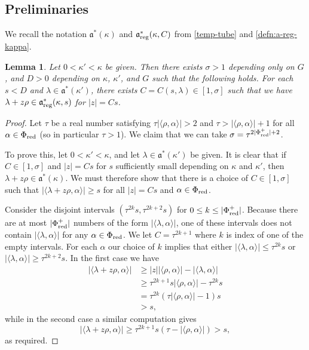 \documentclass[12pt]{amsart}
\newtheorem{lemma}[theorem]{Lemma}
\theoremstyle{remark}
\begin{document}
\subsection{Preliminaries}
\label{sec:sph-fn-prelim}

We recall the notation $\mathfrak{a}^* (\kappa)$ and $\mathfrak{a}_{\rm reg}^* (\kappa,C)$ from \eqref{temp-tube} and \eqref{defn:a-reg-kappa}.

\begin{lemma}
\label{lemma:diskchoice}
    Let $0 < \kappa' < \kappa$ be given. Then there exists $\sigma > 1$ depending only on $G$, and $D > 0$ depending on $\kappa$, $\kappa'$, and $G$ such that the following holds. For each $s < D$ and $\lambda \in \mathfrak{a}^*(\kappa')$, there exists $C = C(s,\lambda) \in [1, \sigma]$ such that we have $\lambda + z \rho \in \mathfrak{a}^*_{\textnormal{reg}}(\kappa, s)$ for $|z| = C s$.  
\end{lemma}
\begin{proof}
    Let $\tau$ be a real number satisfying $\tau | \langle \rho, \alpha \rangle | > 2$ and $\tau > |\langle \rho, \alpha \rangle| + 1$ for all $\alpha \in \Phi_{\textnormal{red}}$ (so in particular $\tau > 1$). We claim that we can take $\sigma = \tau^{2|\Phi_{\textnormal{red}}^+| + 2}$. 
    
    To prove this, let $0 < \kappa' < \kappa$, and let $\lambda \in \mathfrak{a}^*(\kappa')$ be given. It is clear that if $C \in [1, \sigma]$ and $|z| = C s$ for $s$ sufficiently small depending on $\kappa$ and $\kappa'$, then $\lambda + z \rho \in \mathfrak{a}^*(\kappa)$. We must therefore show that there is a choice of $C \in [1, \sigma]$ such that $|\langle \lambda + z \rho, \alpha \rangle| \geq s$ for all $|z| = C s$ and $\alpha \in \Phi_{\textnormal{red}}$. 

    Consider the disjoint intervals $(\tau^{2k} s, \tau^{2k+2} s)$ for $0 \leq k \leq |\Phi_{\textnormal{red}}^+|$. Because there are at most $|\Phi_{\textnormal{red}}^+|$ numbers of the form $|\langle \lambda, \alpha \rangle|$, one of these intervals does not contain $|\langle \lambda, \alpha \rangle|$ for any $\alpha \in \Phi_{\textnormal{red}}$. We let $C = \tau^{2k + 1}$ where $k$ is index of one of the empty intervals. For each $\alpha$ our choice of $k$ implies that either $|\langle \lambda, \alpha \rangle| \leq \tau^{2k} s$ or $|\langle \lambda, \alpha \rangle| \geq \tau^{2k+2} s$. In the first case we have
\begin{align*}
| \langle \lambda + z \rho, \alpha \rangle| & \ge |z| | \langle \rho, \alpha \rangle| - | \langle \lambda, \alpha \rangle| \\
& \ge \tau^{2k+1} s | \langle \rho, \alpha \rangle| - \tau^{2k} s\\
& = \tau^{2k}(\tau | \langle \rho, \alpha \rangle| - 1) s \\
& > s,
\end{align*}
%
while in the second case a similar computation gives
\[
| \langle \lambda + z \rho, \alpha \rangle| \ge \tau^{2k+1} s (\tau - | \langle \rho, \alpha \rangle|) > s,
\]
as required.
\end{proof}
\end{document}

